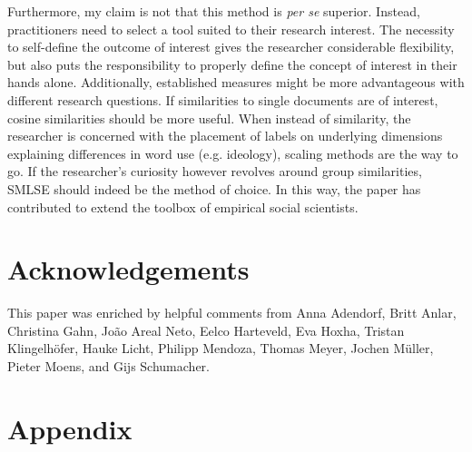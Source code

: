 \documentclass{article}
\begin{document}
Furthermore, my claim is not that this method is \textit{per se} superior. Instead, practitioners need to select a tool suited to their research interest. The necessity to self-define the outcome of interest gives the researcher considerable flexibility, but also puts the responsibility to properly define the concept of interest in their hands alone. Additionally, established measures might be more advantageous with different research questions. If similarities to single documents are of interest, cosine similarities should be more useful. When instead of similarity, the researcher is concerned with the placement of labels on underlying dimensions explaining differences in word use (e.g. ideology), scaling methods are the way to go. If the researcher's curiosity however revolves around group similarities, SMLSE should indeed be the method of choice. In this way, the paper has contributed to extend the toolbox of empirical social scientists. \par



\section*{Acknowledgements}
This paper was enriched by helpful comments from Anna Adendorf, Britt Anlar, Christina Gahn, João Areal Neto, Eelco Harteveld, Eva Hoxha, Tristan Klingelhöfer, Hauke Licht, Philipp Mendoza, Thomas Meyer, Jochen Müller, Pieter Moens, and Gijs Schumacher.


\printbibliography

\newpage

\section*{Appendix}


\end{document}
